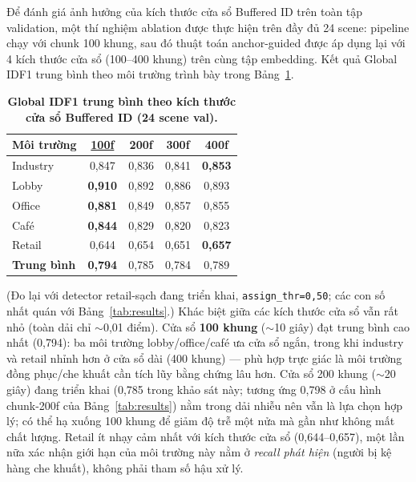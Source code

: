 \documentclass{article} %
\begin{document}
Để đánh giá ảnh hưởng của kích thước cửa sổ Buffered ID trên toàn tập validation, một thí nghiệm ablation được thực hiện trên đầy đủ 24 scene: pipeline chạy với chunk 100 khung, sau đó thuật toán anchor-guided được áp dụng lại với 4 kích thước cửa sổ (100--400 khung) trên cùng tập embedding. Kết quả Global IDF1 trung bình theo môi trường trình bày trong Bảng~\ref{tab:window_ablation}.

\begin{table}[H]
    \centering
    \caption[Khảo sát kích thước cửa sổ Buffered ID --- toàn tập 24 scene]{\bfseries\fontsize{12pt}{0pt}\selectfont Global IDF1 trung bình theo kích thước cửa sổ Buffered ID (24 scene val).}
    \begin{tabular}{|l|c|c|c|c|}
    \hline
    \bfseries Môi trường & \bfseries \underline{100f} & \bfseries 200f & \bfseries 300f & \bfseries 400f \\
    \hline
    Industry  & 0,847 & 0,836 & 0,841 & \textbf{0,853} \\
    Lobby     & \textbf{0,910} & 0,892 & 0,886 & 0,893 \\
    Office    & \textbf{0,881} & 0,849 & 0,857 & 0,855 \\
    Café      & \textbf{0,844} & 0,829 & 0,820 & 0,823 \\
    Retail    & 0,644 & 0,654 & 0,651 & \textbf{0,657} \\
    \hline
    \textbf{Trung bình} & \textbf{0,794} & 0,785 & 0,784 & 0,789 \\
    \hline
    \end{tabular}
    \label{tab:window_ablation}
\end{table}

(Đo lại với detector retail-sạch đang triển khai, \texttt{assign\_thr=0,50}; các con số nhất quán với
Bảng~\ref{tab:results}.) Khác biệt giữa các kích thước cửa sổ vẫn rất nhỏ (toàn dải chỉ $\sim$0,01
điểm). Cửa sổ \textbf{100 khung} ($\sim$10 giây) đạt trung bình cao nhất (0,794): ba môi trường
lobby/office/café ưa cửa sổ ngắn, trong khi industry và retail nhỉnh hơn ở cửa sổ dài (400 khung) ---
phù hợp trực giác là môi trường đồng phục/che khuất cần tích lũy bằng chứng lâu hơn. Cửa sổ 200 khung
($\sim$20 giây) đang triển khai (0,785 trong khảo sát này; tương ứng 0,798 ở cấu hình chunk-200f của
Bảng~\ref{tab:results}) nằm trong dải nhiễu nên vẫn là lựa chọn hợp lý; có thể hạ xuống 100 khung để
giảm độ trễ một nửa mà gần như không mất chất lượng. Retail ít nhạy cảm nhất với kích thước cửa sổ
(0,644--0,657), một lần nữa xác nhận giới hạn của môi trường này nằm ở \textit{recall phát hiện} (người
bị kệ hàng che khuất), không phải tham số hậu xử lý.
\end{document}

